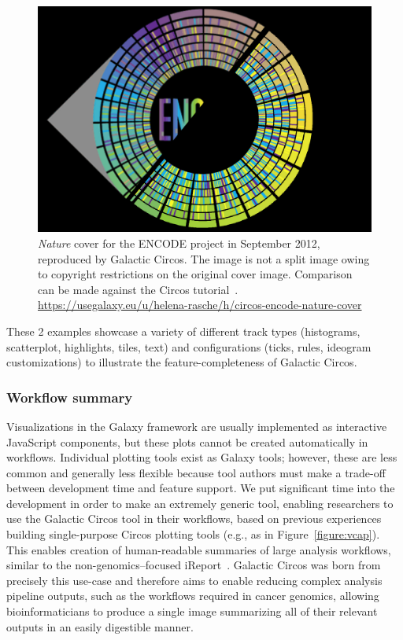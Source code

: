 \begin{figure}[h!]
\centering
\includegraphics[width=0.7\linewidth]{chapters/images/circos/plot-encode-both.png}
\caption{\emph{Nature} cover for the ENCODE project in September 2012, reproduced by Galactic Circos. The image is not a split image owing to copyright restrictions on the original cover image. Comparison can be made against the Circos tutorial~\cite{circos-nature-example}. \url{https://usegalaxy.eu/u/helena-rasche/h/circos-encode-nature-cover}}\label{figure:encode}
\end{figure}

These 2 examples showcase a variety of different track types (histograms, scatterplot, highlights, tiles, text) and configurations (ticks, rules, ideogram customizations) to illustrate the feature-completeness of Galactic Circos. %

\subsubsection{Workflow summary}
Visualizations in the Galaxy framework are usually implemented as interactive JavaScript components, but these plots cannot be created automatically in workflows.
Individual plotting tools exist as Galaxy tools; however, these are less common and generally less flexible because tool authors must make a trade-off between development time and feature support.
We put significant time into the development in order to make an extremely generic tool, enabling researchers to use the Galactic Circos tool in their workflows, based on previous experiences building single-purpose Circos plotting tools (e.g., as in Figure~\ref{figure:vcap}).
This enables creation of human-readable summaries of large analysis workflows, similar to the non-genomics–focused iReport~\cite{hiltemann2014ireport}. Galactic Circos was born from precisely this use-case and therefore aims to enable reducing complex analysis pipeline outputs, such as the workflows required in cancer genomics, allowing bioinformaticians to produce a single image summarizing all of their relevant outputs in an easily digestible manner.

